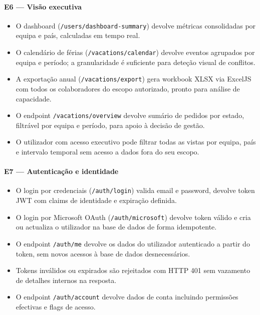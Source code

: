 \documentclass[11pt,a4paper,twoside]{article}
\begin{document}
\paragraph{E6 — Visão executiva}
\begin{itemize}
  \item O dashboard (\texttt{/users/dashboard-summary}) devolve métricas consolidadas por equipa e país, calculadas em tempo real.
  \item O calendário de férias (\texttt{/vacations/calendar}) devolve eventos agrupados por equipa e período; a granularidade é suficiente para deteção visual de conflitos.
  \item A exportação anual (\texttt{/vacations/export}) gera workbook XLSX via ExcelJS com todos os colaboradores do escopo autorizado, pronto para análise de capacidade.
  \item O endpoint \texttt{/vacations/overview} devolve sumário de pedidos por estado, filtrável por equipa e período, para apoio à decisão de gestão.
  \item O utilizador com acesso executivo pode filtrar todas as vistas por equipa, país e intervalo temporal sem acesso a dados fora do seu escopo.
\end{itemize}

\paragraph{E7 — Autenticação e identidade}
\begin{itemize}
  \item O login por credenciais (\texttt{/auth/login}) valida email e password, devolve token JWT com claims de identidade e expiração definida.
  \item O login por Microsoft OAuth (\texttt{/auth/microsoft}) devolve token válido e cria ou actualiza o utilizador na base de dados de forma idempotente.
  \item O endpoint \texttt{/auth/me} devolve os dados do utilizador autenticado a partir do token, sem novos acessos à base de dados desnecessários.
  \item Tokens inválidos ou expirados são rejeitados com HTTP 401 sem vazamento de detalhes internos na resposta.
  \item O endpoint \texttt{/auth/account} devolve dados de conta incluindo permissões efectivas e flags de acesso.
\end{itemize}
\end{document}
